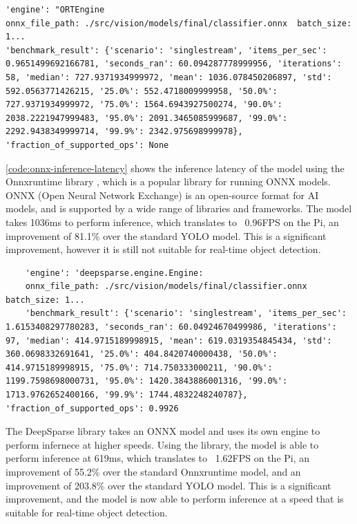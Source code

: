 \begin{minipage}[H]{\textwidth}
  \centering
  \begin{verbatim}
'engine': "ORTEngine
onnx_file_path: ./src/vision/models/final/classifier.onnx  batch_size: 1...
'benchmark_result': {'scenario': 'singlestream', 'items_per_sec': 0.9651499692166781, 'seconds_ran': 60.094287778999956, 'iterations': 58, 'median': 727.9371934999972, 'mean': 1036.078450206897, 'std': 592.0563771426215, '25.0%': 552.4718009999958, '50.0%': 727.9371934999972, '75.0%': 1564.6943927500274, '90.0%': 2038.2221947999483, '95.0%': 2091.3465085999687, '99.0%': 2292.9438349999714, '99.9%': 2342.975698999978}, 'fraction_of_supported_ops': None
  \end{verbatim}
  \label{code:onnx-inference-latency}
\end{minipage}

\autoref{code:onnx-inference-latency} shows the inference latency of the model using the Onnxruntime library \cite{onnxruntime}, which is a popular library for running ONNX models. ONNX (Open Neural Network Exchange) is an open-source format for AI models, and is supported by a wide range of libraries and frameworks. The model takes 1036ms to perform inference, which translates to ~0.96FPS on the Pi, an improvement of 81.1\% over the standard YOLO model. This is a significant improvement, however it is still not suitable for real-time object detection.

\begin{minipage}[H]{\textwidth}
  \centering
  \begin{verbatim}
    'engine': 'deepsparse.engine.Engine:
    onnx_file_path: ./src/vision/models/final/classifier.onnx batch_size: 1...
    'benchmark_result': {'scenario': 'singlestream', 'items_per_sec': 1.6153408297780283, 'seconds_ran': 60.04924670499986, 'iterations': 97, 'median': 414.9715189998915, 'mean': 619.0319354845434, 'std': 360.0698332691641, '25.0%': 404.8420740000438, '50.0%': 414.9715189998915, '75.0%': 714.750333000211, '90.0%': 1199.7598698000731, '95.0%': 1420.3843886001316, '99.0%': 1713.9762652400166, '99.9%': 1744.4832248240787}, 'fraction_of_supported_ops': 0.9926
  \end{verbatim}
  \label{code:deepsparse-inference-latency}
\end{minipage}

The DeepSparse library \cite{deepsparse} takes an ONNX model and uses its own engine to perform infernece at higher speeds. Using the library, the model is able to perform inference at 619ms, which translates to ~1.62FPS on the Pi, an improvement of 55.2\% over the standard Onnxruntime model, and an improvement of 203.8\% over the standard YOLO model. This is a significant improvement, and the model is now able to perform inference at a speed that is suitable for real-time object detection.